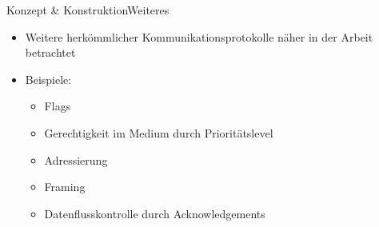 \documentclass{beamer}
\begin{document}

\begin{frame}[t]{Konzept \& Konstruktion}{Weiteres}
    \begin{itemize}
        \item Weitere \textbf{\color{uzl_oceangreen}{Mechanismen}} herkömmlicher Kommunikationsprotokolle näher in der Arbeit betrachtet
        \item Beispiele:
        \begin{itemize}
            \item Flags
            \item Gerechtigkeit im Medium durch Prioritätslevel
            \item Adressierung
            \item Framing 
            \item Datenflusskontrolle durch Acknowledgements
        \end{itemize}
    \end{itemize}
\end{frame}
\end{document}
